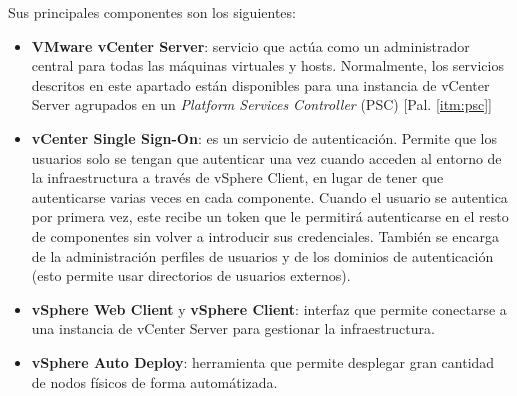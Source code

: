 Sus principales componentes son los siguientes:
\begin{itemize}
    
    
    \item \textbf{VMware vCenter Server}: servicio que actúa como un administrador central para todas las máquinas virtuales y hosts. Normalmente, los servicios descritos en este apartado están disponibles para una instancia de vCenter Server agrupados en un \textit{Platform Services Controller} (PSC) [Pal. \ref{itm:psc}]
    
    \item \textbf{vCenter Single Sign-On}: es un servicio de autenticación. Permite que los usuarios solo se tengan que autenticar una vez cuando acceden al entorno de la infraestructura a través de vSphere Client, en lugar de tener que autenticarse varias veces en cada componente. Cuando el usuario se autentica por primera vez, este recibe un token que le permitirá autenticarse en el resto de componentes sin volver a introducir sus credenciales. También se encarga de la administración perfiles de usuarios y de los dominios de autenticación (esto permite usar directorios de usuarios externos).\label{itm:singlesingonEX}
    
    
    \item \textbf{vSphere Web Client} y \textbf{vSphere Client}: interfaz que permite conectarse a una instancia de vCenter Server para gestionar la infraestructura.
    
    

    \item \textbf{vSphere Auto Deploy}: herramienta que permite desplegar gran cantidad de nodos físicos de forma automátizada.
    

\end{itemize}
